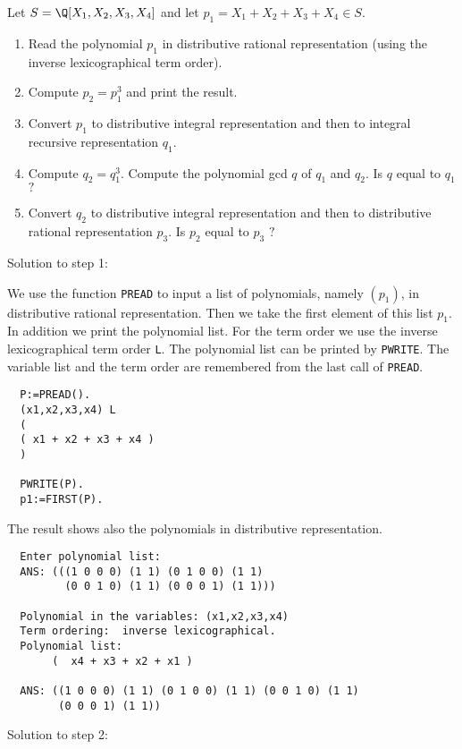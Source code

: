 Let $S = \Q \lbrack X_1, X_2, X_3, X_4 \rbrack$ and
let $p_1 = X_1 + X_2 + X_3 + X_4 \in S$.
\begin{enumerate}
\item Read the polynomial $p_1$ in distributive rational 
      representation (using the 
      inverse lexicographical term order).
\item Compute $p_2 = p_1^3$ and print the result.
\item Convert $p_1$ to distributive integral representation and 
      then to integral recursive representation $q_1$.
\item Compute $q_2 = q_1^3$.
      Compute the polynomial gcd $q$ of $q_1$ and $q_2$. 
      Is $q$ equal to $q_1$ $?$
\item Convert $q_2$ to distributive integral representation 
      and then to distributive rational representation $p_3$.
      Is $p_2$ equal to $p_3$ $?$
\end{enumerate}

Solution to step 1:

We use the function \verb/PREAD/ to input a list 
of polynomials, namely $( p_1 )$,
in distributive rational representation. 
Then we take the first element of this list $p_1$. 
In addition we print the polynomial list. 
For the term order we use the 
inverse lexicographical term order \verb/L/. 
The polynomial list can be printed by \verb/PWRITE/.
The variable list and the term order are remembered 
from the last call of \verb/PREAD/.

{\footnotesize
\begin{verbatim}
  P:=PREAD().
  (x1,x2,x3,x4) L
  (
  ( x1 + x2 + x3 + x4 )
  )

  PWRITE(P).
  p1:=FIRST(P).
\end{verbatim}
}

The result shows also the polynomials in 
distributive representation.

{\footnotesize
\begin{verbatim}
  Enter polynomial list: 
  ANS: (((1 0 0 0) (1 1) (0 1 0 0) (1 1) 
         (0 0 1 0) (1 1) (0 0 0 1) (1 1)))
 
  Polynomial in the variables: (x1,x2,x3,x4)
  Term ordering:  inverse lexicographical.
  Polynomial list: 
       (  x4 + x3 + x2 + x1 )
           
  ANS: ((1 0 0 0) (1 1) (0 1 0 0) (1 1) (0 0 1 0) (1 1) 
        (0 0 0 1) (1 1))
\end{verbatim}
}

Solution to step 2:


